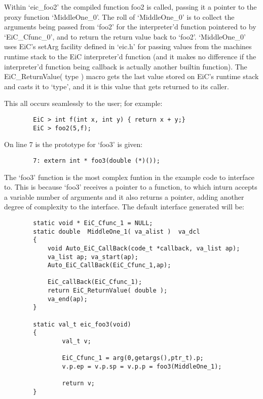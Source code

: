 Within `eic\_foo2' the compiled function foo2 is called, passing it a
pointer to the proxy function `MiddleOne\_0'. The roll of `MiddleOne\_0'
is to collect the arguments being passed from `foo2' for the
interpreter'd function pointered to by `EiC\_Cfunc\_0', and to return
the return value back to `foo2'. `MiddleOne\_0' uses EiC's setArg
facility defined in `eic.h' for passing values from the machines
runtime stack to the EiC interpreter'd function (and it makes no
difference if the interpreter'd function being callback is actually
another builtin function). The EiC\_ReturnValue( type ) macro gets the
last value stored on EiC's runtime stack and casts it to `type', and it
is this value that gets returned to its caller. 

This all occurs seamlessly to the user; for  example:

\small
\begin{verbatim}
        EiC > int f(int x, int y) { return x + y;}
        EiC > foo2(5,f);
\end{verbatim}
\normalsize

On line 7 is the prototype for `foo3' is given:

\small
\begin{verbatim}
        7: extern int * foo3(double (*)());
\end{verbatim}
\normalsize

The `foo3' function is the most complex funtion in the example code to
interface to. This is because `foo3' receives a pointer to a function,
to which inturn accepts a variable number of arguments and it also
returns a pointer, adding another degree of complexity to the
interface. The default interface generated will be:

\small
\begin{verbatim}
        static void * EiC_Cfunc_1 = NULL;
        static double  MiddleOne_1( va_alist )  va_dcl
        {
            void Auto_EiC_CallBack(code_t *callback, va_list ap);
            va_list ap; va_start(ap);
            Auto_EiC_CallBack(EiC_Cfunc_1,ap);
        
            EiC_callBack(EiC_Cfunc_1);
            return EiC_ReturnValue( double );
            va_end(ap);
        }
        
        static val_t eic_foo3(void)
        {
                val_t v;
        
                EiC_Cfunc_1 = arg(0,getargs(),ptr_t).p;
                v.p.ep = v.p.sp = v.p.p = foo3(MiddleOne_1);
        
                return v;
        }
\end{verbatim}
\normalsize

